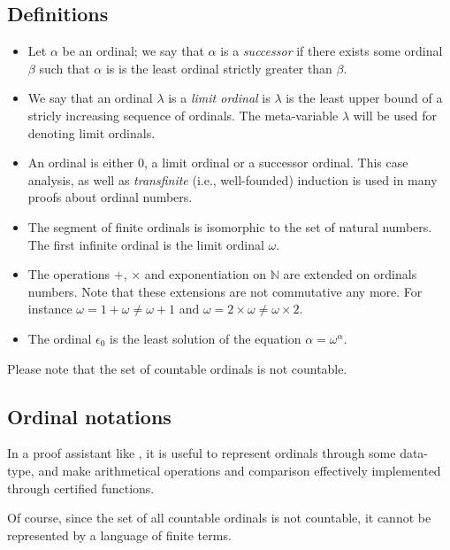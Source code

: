 \subsection{Definitions}

\begin{itemize}
\item Let  $\alpha$ be an ordinal; we say that  $\alpha$ is a \emph{successor} if there exists some ordinal  $\beta$ such that 
$\alpha$ is is the least ordinal strictly greater than  $\beta$.

\item We say that an ordinal $\lambda$ is a \emph{limit ordinal} is $\lambda$  is the least upper bound of a stricly increasing sequence of ordinals.
The meta-variable $\lambda$ will be used for denoting  limit ordinals.

\item {}
An ordinal is either $0$, a limit ordinal or a successor ordinal. This case analysis, as well as \emph{transfinite} ({i.e.}, well-founded) induction is used in many proofs about ordinal numbers.

\item The segment of finite ordinals is isomorphic to the set of natural numbers.
 The first infinite ordinal is the limit ordinal $\omega$.
 
\item The operations $+$, $\times$ and exponentiation on $\mathbb{N}$ are extended on ordinals numbers. Note that these  extensions are not commutative any more.  For instance $\omega = 1 + \omega \not= \omega + 1$
and $\omega = 2 \times \omega \not= \omega \times 2$.

\item The ordinal $\epsilon_0$ is the least solution of the equation
 \(\alpha=\omega^{\alpha}\).
\end{itemize}


Please note that the set of countable ordinals is not countable.

 


\subsection{Ordinal notations}
In a proof assistant like \coq{},  it is useful to represent ordinals through some data-type, and make arithmetical operations and comparison effectively implemented  through certified functions.

Of course, since the set of all countable ordinals is not countable, it cannot be represented by a language of finite terms. 



